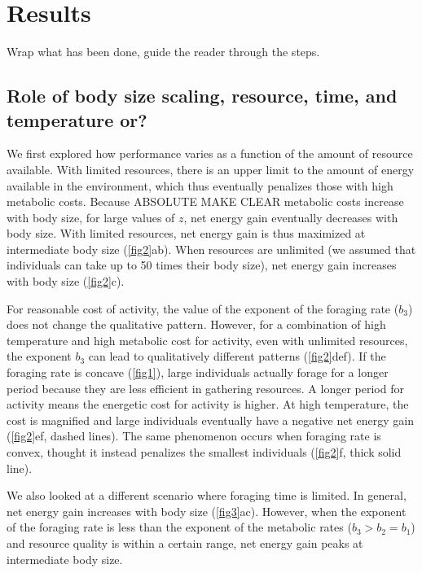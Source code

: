 \section*{Results}

Wrap what has been done, guide the reader through the steps.
\subsection*{Role of body size scaling, resource, time, and temperature or?}
We first explored how performance varies as a function of the amount of resource available.
With limited resources,  there is an upper limit to the amount of energy available in the environment, which thus eventually penalizes those with high metabolic costs.
Because ABSOLUTE MAKE CLEAR metabolic costs increase with  body size, for large values of $z$, net energy gain eventually decreases with body size.
With limited resources, net energy gain is thus maximized at intermediate body size (\cref{fig2}ab).
 When resources are unlimited (we assumed that individuals can take up to 50 times their body size), net energy gain increases with body size (\cref{fig2}c).

For reasonable cost of activity, the value of the exponent of the foraging rate ($b_3$) does not change the qualitative pattern.
However,  for a combination of high temperature and high metabolic cost for activity, even with unlimited resources, the exponent $b_3$ can lead to qualitatively different patterns   (\cref{fig2}def).
If the foraging rate is concave (\cref{fig1}), large individuals actually forage for a longer period because they are less efficient in gathering resources.
A longer period for  activity means the energetic cost for activity is higher.
At high temperature, the cost is magnified and  large individuals eventually have a negative net energy gain (\cref{fig2}ef, dashed lines).
The same phenomenon occurs when foraging rate is convex, thought it instead penalizes the smallest individuals (\cref{fig2}f, thick solid line).

We also looked at a different scenario where foraging time is limited.
In general, net energy gain increases with body size (\cref{fig3}ac).
However, when the exponent of the foraging rate is less than the exponent of the metabolic rates ($b_3 > b_2 = b_1$) and resource quality is within a certain range,  net energy gain peaks at intermediate body size.

